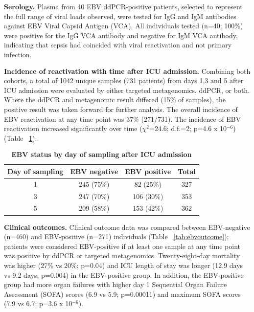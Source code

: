 \textbf{Serology.}
Plasma from 40 EBV ddPCR-positive patients, selected to represent the full range of viral loads observed, were tested for IgG and IgM antibodies against EBV Viral Capsid Antigen (VCA). All individuals tested (n=40; 100\%) were positive for the IgG VCA antibody and negative for IgM VCA antibody, indicating that sepsis had coincided with viral reactivation and not primary infection.

\textbf{Incidence of reactivation with time after ICU admission.}
Combining both cohorts, a total of 1042 unique samples (731 patients) from days 1,3 and 5 after ICU admission were evaluated by either targeted metagenomics, ddPCR, or both. Where the ddPCR and metagenomic result differed (15\% of samples), the positive result was taken forward for further analysis. The overall incidence of EBV reactivation at any time point was 37\% (271/731). The incidence of EBV reactivation increased significantly over time ($\chi^2$=24.6; d.f.=2; p=4.6 x 10$^{-6}$) (Table ~\ref{tab:ebvincidence}).

\FloatBarrier
\begin{table}[]
\begin{center}
\begin{tabular}{|c|c|c|c|}
\hline
\textbf{Day of sampling} & \textbf{EBV negative} & \textbf{EBV positive} & \textbf{Total} \\ \hline
1                        & 245 (75\%)            & 82 (25\%)             & 327            \\ \hline
3                        & 247 (70\%)            & 106 (30\%)            & 353            \\ \hline
5                        & 209 (58\%)            & 153 (42\%)            & 362            \\ \hline
\end{tabular}
\end{center}
\smallskip
\caption[EBV status by day of sampling]{\textbf{EBV status by day of sampling after ICU admission}}
\label{tab:ebvincidence}
\end{table}

\textbf{Clinical outcomes.}
Clinical outcome data was compared between EBV-negative (n=460) and EBV-positive (n=271) individuals (Table ~\ref{tab:ebvoutcome}); patients were considered EBV-positive if at least one sample at any time point was positive by ddPCR or targeted metagenomics. Twenty-eight-day mortality was higher (27\% vs 20\%; p=0.04) and ICU length of stay was longer (12.9 days vs 9.2 days; p=0.004) in the EBV-positive group. In addition, the EBV-positive group had more organ failures with higher day 1 Sequential Organ Failure Assessment (SOFA) scores (6.9 vs 5.9; p=0.00011) and maximum SOFA scores (7.9 vs 6.7; p=3.6 x 10$^{-6}$).

